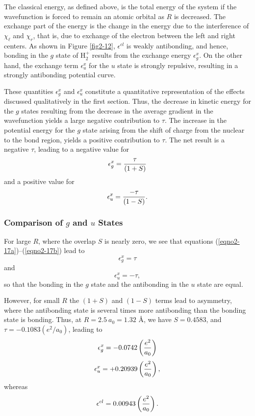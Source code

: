 The classical energy, as defined above, is the total energy of the
system if the wavefunction is forced to remain an atomic orbital as
$R$ is decreased. The exchange part of the energy is the change in the
energy due to the interference of $\chi_\ell$ and $\chi_r$, that is, due
to exchange of the electron between the left and right centers. As
shown in Figure \ref{fig2-12}, $\epsilon^{cl}$ is weakly antibonding,
and hence, bonding in the $g$ state of H$^+_2$ results from the
exchange energy $\epsilon^x_g$.  On the other hand, the exchange term
$\epsilon_u^x$ for the $u$ state is strongly repulsive, resulting in a
strongly antibonding potential curve.
    
These quantities $\epsilon_g^x$ and $\epsilon_u^x$ constitute a 
quantitative representation of
the effects discussed qualitatively in the first section. Thus, the 
decrease in kinetic energy for the $g$ states resulting from the 
decrease in the average gradient in the wavefunction
yields a large negative contribution to $\tau$. The increase in the 
potential energy for the $g$ state arising from the shift of charge 
from the nuclear to the bond region, yields a positive
contribution to $\tau$. The net result is a negative $\tau$, leading 
to a negative value for
\begin{equation}
\epsilon_g^x = {\tau \over (1+S)}
\end{equation}    
and a positive value for
\begin{equation}    
\epsilon_u^x = {- \tau \over (1-S)}.
\end{equation} 

\subsubsection{Comparison of $g$ and $u$ States}
    
For large $R$, where the overlap $S$ is nearly zero, we see that
equations (\ref{eqno2-17a})--(\ref{eqno2-17b}) lead to
\begin{equation}
\epsilon_g^x = \tau
\end{equation}
and
\begin{equation}
\epsilon_u^x = - \tau,
\end{equation}
so that the bonding in the $g$ state and the antibonding in the $u$ 
state are equal.
    
However, for small $R$ the $(1 + S)$ and $(1 - S)$ terms lead to 
asymmetry, where the antibonding state is several times more antibonding 
than the bonding state is bonding.  Thus, at $R = 2.5\ a_0 = 1.32$ \AA, 
we have $S = 0.4583$, and $\tau  = -0.1083(e^2 /a_0)$, leading to
\begin{equation}
\epsilon_g^x = - 0.0742 \left( {e^2 \over a_0} \right)
\end{equation}
\begin{equation}
\epsilon_u^x = + 0.20939 \left( {e^2 \over a_0} \right),
\end{equation}
whereas
\begin{equation}
\epsilon^{cl} = 0.00943 \left( {e^2 \over a_0} \right) .
\end{equation}

